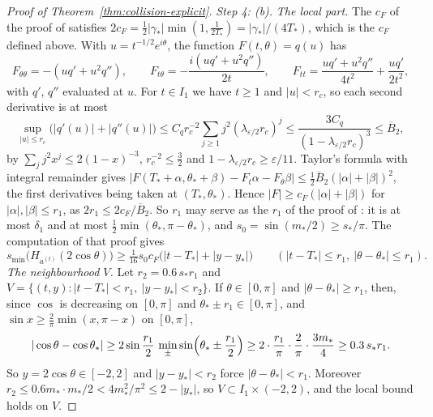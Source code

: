 \documentclass[11pt]{amsart}
\theoremstyle{definition}
\theoremstyle{remark}
\numberwithin{equation}{section}
\newcommand{\eps}{\varepsilon}
\begin{document}
\begin{proof}[Proof of Theorem~\ref{thm:collision-explicit}]
\emph{Step 4: \cite[Lemma~\ref{M-lem:degenerate}]{Main}(b).} \emph{The local part.} The $c_F$ of the proof of \cite[Lemma~\ref{M-lem:degenerate}]{Main} satisfies $2c_F=\frac12|\gamma_*|\min(1,\frac1{2T_*})=|\gamma_*|/(4T_*)$, which is the $c_F$ defined above. With $u=t^{-1/2}e^{i\theta}$, the function $F(t,\theta)=q(u)$ has
\[
F_{\theta\theta}=-(uq'+u^2q''),\qquad F_{t\theta}=-\frac{i(uq'+u^2q'')}{2t},\qquad F_{tt}=\frac{uq'+u^2q''}{4t^2}+\frac{uq'}{2t^2},
\]
with $q'$, $q''$ evaluated at $u$. For $t\in I_1$ we have $t\ge1$ and $|u|<r_c$, so each second derivative is at most
\[
\sup_{|u|\le r_c}\bigl(|q'(u)|+|q''(u)|\bigr)\le C_qr_c^{-2}\sum_{j\ge1}j^2(\lambda_{\eps/2}r_c)^j\le\frac{3C_q}{(1-\lambda_{\eps/2}r_c)^3}\le\overline B_2,
\]
by $\sum_jj^2x^j\le2(1-x)^{-3}$, $r_c^{-2}\le\frac32$ and $1-\lambda_{\eps/2}r_c\ge\eps/11$. Taylor's formula with integral remainder gives $|F(T_*+\alpha,\theta_*+\beta)-F_t\alpha-F_\theta\beta|\le\frac12\overline B_2(|\alpha|+|\beta|)^2$, the first derivatives being taken at $(T_*,\theta_*)$. Hence $|F|\ge c_F(|\alpha|+|\beta|)$ for $|\alpha|,|\beta|\le r_1$, as $2r_1\le2c_F/\overline B_2$. So $r_1$ may serve as the $r_1$ of the proof of \cite[Lemma~\ref{M-lem:degenerate}]{Main}: it is at most $\delta_1$ and at most $\frac12\min(\theta_*,\pi-\theta_*)$, and $s_0=\sin(m_*/2)\ge s_*/\pi$. The computation of that proof gives
\[
s_{\min}\bigl(H_{a^{(t)}}(2\cos\theta)\bigr)\ge\tfrac1{16}s_0c_F\bigl(|t-T_*|+|y-y_*|\bigr)\qquad(|t-T_*|\le r_1,\ |\theta-\theta_*|\le r_1).
\]
\emph{The neighbourhood $V$.} Let $r_2=0.6\,s_*r_1$ and $V=\{(t,y):|t-T_*|<r_1,\ |y-y_*|<r_2\}$. If $\theta\in[0,\pi]$ and $|\theta-\theta_*|\ge r_1$, then, since $\cos$ is decreasing on $[0,\pi]$ and $\theta_*\pm r_1\in[0,\pi]$, and $\sin x\ge\frac2\pi\min(x,\pi-x)$ on $[0,\pi]$,
\[
|\cos\theta-\cos\theta_*|\ge2\sin\frac{r_1}2\,\min_\pm\sin\Bigl(\theta_*\pm\frac{r_1}2\Bigr)\ge2\cdot\frac{r_1}\pi\cdot\frac2\pi\cdot\frac{3m_*}4\ge0.3\,s_*r_1 .
\]
So $y=2\cos\theta\in[-2,2]$ and $|y-y_*|<r_2$ force $|\theta-\theta_*|<r_1$. Moreover $r_2\le0.6m_*\cdot m_*/2<4m_*^2/\pi^2\le2-|y_*|$, so $V\subset I_1\times(-2,2)$, and the local bound holds on $V$.


\end{proof}
\end{document}

